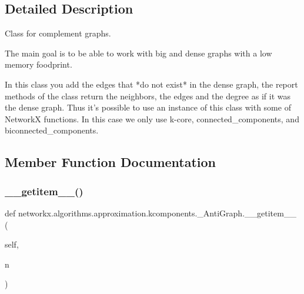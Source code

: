 \subsection{Detailed Description}
\begin{DoxyVerb}Class for complement graphs.

The main goal is to be able to work with big and dense graphs with
a low memory foodprint.

In this class you add the edges that *do not exist* in the dense graph,
the report methods of the class return the neighbors, the edges and
the degree as if it was the dense graph. Thus it's possible to use
an instance of this class with some of NetworkX functions. In this
case we only use k-core, connected_components, and biconnected_components.
\end{DoxyVerb}
 

\subsection{Member Function Documentation}
\mbox{\label{classnetworkx_1_1algorithms_1_1approximation_1_1kcomponents_1_1__AntiGraph_af08acb13478a6ec8ffe23e64524428db}} 
\subsubsection{\texorpdfstring{\+\_\+\+\_\+getitem\+\_\+\+\_\+()}{\_\_getitem\_\_()}}
{\footnotesize\ttfamily def networkx.\+algorithms.\+approximation.\+kcomponents.\+\_\+\+Anti\+Graph.\+\_\+\+\_\+getitem\+\_\+\+\_\+ (\begin{DoxyParamCaption}\item[{}]{self,  }\item[{}]{n }\end{DoxyParamCaption})}

